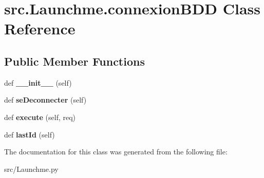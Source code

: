 \hypertarget{classsrc_1_1_launchme_1_1connexion_b_d_d}{}\section{src.\+Launchme.\+connexion\+B\+D\+D Class Reference}
\label{classsrc_1_1_launchme_1_1connexion_b_d_d}
\subsection*{Public Member Functions}
\begin{DoxyCompactItemize}
\item 
\hypertarget{classsrc_1_1_launchme_1_1connexion_b_d_d_a6dbb0bf6f68199fc1e9f9cd57226705e}{}def {\bfseries \+\_\+\+\_\+init\+\_\+\+\_\+} (self)\label{classsrc_1_1_launchme_1_1connexion_b_d_d_a6dbb0bf6f68199fc1e9f9cd57226705e}

\item 
\hypertarget{classsrc_1_1_launchme_1_1connexion_b_d_d_ab3138577af9e1ee07831ffa8bed37375}{}def {\bfseries se\+Deconnecter} (self)\label{classsrc_1_1_launchme_1_1connexion_b_d_d_ab3138577af9e1ee07831ffa8bed37375}

\item 
\hypertarget{classsrc_1_1_launchme_1_1connexion_b_d_d_ab1bda0c9f85804463079583835062d47}{}def {\bfseries execute} (self, req)\label{classsrc_1_1_launchme_1_1connexion_b_d_d_ab1bda0c9f85804463079583835062d47}

\item 
\hypertarget{classsrc_1_1_launchme_1_1connexion_b_d_d_a8a042f021781407fd2e5087f09cfca8e}{}def {\bfseries last\+Id} (self)\label{classsrc_1_1_launchme_1_1connexion_b_d_d_a8a042f021781407fd2e5087f09cfca8e}

\end{DoxyCompactItemize}


The documentation for this class was generated from the following file\+:\begin{DoxyCompactItemize}
\item 
src/Launchme.\+py\end{DoxyCompactItemize}
